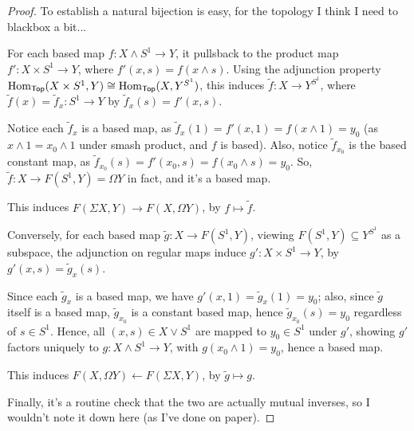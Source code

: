 \documentclass{article}
\begin{document}
\begin{proof}
    To establish a natural bijection is easy, for the topology I think I need to blackbox a bit... 

    \hfil

    For each based map $f:X\wedge S^1\rightarrow Y$, it pullsback to the product map $f':X\times S^1\rightarrow Y$, where $f'(x,s) = f(x\wedge s)$. Using the adjunction property $\mathrm{Hom}_{\mathsf{Top}}(X\times S^1,Y)\cong \mathrm{Hom}_{\mathsf{Top}} (X, Y^{S^1})$, this induces $\tilde{f}:X\rightarrow Y^{S^1}$, where $\tilde{f}(x)=\tilde{f}_x: S^1\rightarrow Y$ by $\tilde{f}_x (s)=f'(x,s)$.
    
    Notice each $\tilde{f}_x$ is a based map, as $\tilde{f}_x (1) = f'(x,1) = f(x\wedge 1)=y_0$ (as $x\wedge 1=x_0\wedge 1$ under smash product, and $f$ is based). Also, notice $\tilde{f}_{x_0}$ is the based constant map, as $\tilde{f}_{x_0}(s)= f'(x_0,s)=f(x_0\wedge s)=y_0$. So, $\tilde{f}:X\rightarrow F(S^1,Y)=\Omega Y$ in fact, and it's a based map.

    This induces $F(\Sigma X,Y)\rightarrow F(X,\Omega Y)$, by $f\mapsto \tilde{f}$.

    \hfil

    Conversely, for each based map $\tilde{g}:X\rightarrow F(S^1,Y)$, viewing $F(S^1,Y)\subseteq Y^{S^1}$ as a subspace, the adjunction on regular maps induce $g':X\times S^1\rightarrow Y$, by $g'(x,s)=\tilde{g}_x (s)$.

    Since each $\tilde{g}_x$ is a based map, we have $g'(x,1)=\tilde{g}_x (1)=y_0$; also, since $\tilde{g}$ itself is a based map, $\tilde{g}_{x_0}$ is a constant based map, hence $\tilde{g}_{x_0}(s) = y_0$ regardless of $s\in S^1$. Hence, all $(x,s)\in X\vee S^1$ are mapped to $y_0\in S^1$ under $g'$, showing $g'$ factors uniquely to $g:X\wedge S^1\rightarrow Y$, with $g(x_0\wedge 1)=y_0$, hence a based map.

    This induces $F(X,\Omega Y)\leftarrow F(\Sigma X,Y)$, by $\tilde{g}\mapsto g$.

    \hfil

    Finally, it's a routine check that the two are actually mutual inverses, so I wouldn't note it down here (as I've done on paper).
\end{proof}
\end{document}

